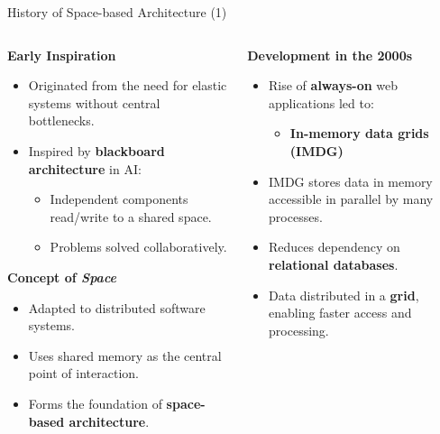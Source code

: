 \documentclass[aspectratio=169, table]{beamer}
\begin{document}
	\begin{frame}{History of Space-based Architecture (1)}
		\vspace{20pt}
		\begin{columns}[t]
			\begin{column}{0.55\textwidth}
				\textbf{Early Inspiration}
				\begin{itemize}
					\item Originated from the need for elastic systems without central bottlenecks.
					\item Inspired by \textbf{blackboard architecture} in AI:
					\begin{itemize}
						\item Independent components read/write to a shared space.
						\item Problems solved collaboratively.
					\end{itemize}
				\end{itemize}
				
				\textbf{Concept of \textit{Space}}
				\begin{itemize}
					\item Adapted to distributed software systems.
					\item Uses shared memory as the central point of interaction.
					\item Forms the foundation of \textbf{space-based architecture}.
				\end{itemize}
			\end{column}
			
			\begin{column}{0.45\textwidth}
				\textbf{Development in the 2000s}
				\begin{itemize}
					\item Rise of \textbf{always-on} web applications led to:
					\begin{itemize}
						\item \textbf{In-memory data grids (IMDG)}
					\end{itemize}
					\item IMDG stores data in memory accessible in parallel by many processes.
					\item Reduces dependency on \textbf{relational databases}.
					\item Data distributed in a \textbf{grid}, enabling faster access and processing.
				\end{itemize}
			\end{column}
		\end{columns}
	\end{frame}
	
\end{document}

